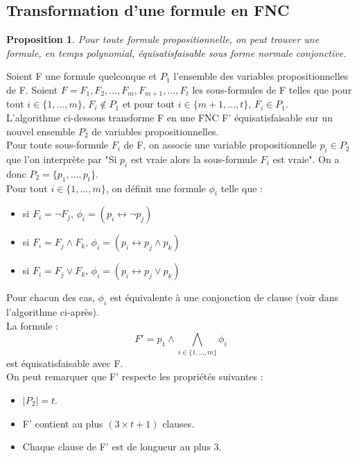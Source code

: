 \documentclass[12pt]{extarticle}
\newtheorem{myprop}{Proposition}
\begin{document}
\subsection*{Transformation d'une formule en FNC}

\begin{myprop}
Pour toute formule propositionnelle, on peut trouver une formule, en temps polynomial, équisatisfaisable sous forme normale conjonctive.
\end{myprop}

Soient F une formule quelconque et $P_1$ l’ensemble des variables propositionnelles de F. Soient $F = F_1, F_2, ..., F_m, F_{m + 1}, ..., F_t$ les sous-formules de F telles que pour tout $i \in \{1, ..., m\}$, $F_i \not\in P_1$ et pour tout $i \in \{m + 1, ..., t\}$, $F_i \in P_1$.\\
L'algorithme ci-dessous transforme F en une FNC F' équisatisfaisable sur un nouvel ensemble $P_2$ de variables propositionnelles.\\
Pour toute sous-formule $F_i$ de F, on associe une variable propositionnelle $p_i \in P_2$ que l'on interprète par "Si $p_i$ est vraie alors la sous-formule $F_i$ est vraie". On a donc $P_2 = \{p_1, ..., p_t\}$. \\
Pour tout $i \in \{1, ..., m\}$, on définit une formule $\phi_i$ telle que :
\begin{itemize}
    \item si $F_i = \lnot{F_j}$, $\phi_i =  (p_i \leftrightarrow \lnot{p_j})$
    \item si $F_i = F_j \land F_k$, $\phi_i =  (p_i \leftrightarrow p_j \land p_k)$
    \item si $F_i = F_j \lor F_k$, $\phi_i =  (p_i \leftrightarrow p_j \lor p_k)$
\end{itemize}
Pour chacun des cas, $\phi_i$ est équivalente à une conjonction de clause (voir dans l'algorithme ci-après).\\
La formule : $$F' = p_1 \land \bigwedge_{i \in \{1, ..., m\}}\phi_i $$ est équisatisfaisable avec F. \\
On peut remarquer que F' respecte les propriétés suivantes : 
\begin{itemize}
    \item $|P_2| = t$.
    \item F' contient au plus $(3 \times t + 1)$ clauses.
    \item Chaque clause de F' est de longueur au plus 3.
\end{itemize}
\end{document}
